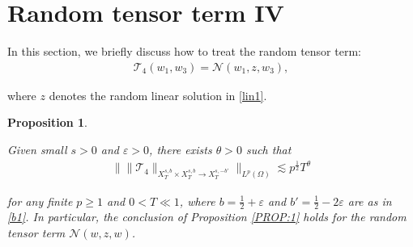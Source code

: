 \documentclass[%
11pt,  reqno]{amsart}
\newtheorem{proposition}[theorem]{Proposition}
\newcommand{\1}{\hspace{0.2mm}\text{I}\hspace{0.2mm}}
\newcommand{\noi}{\noindent}
\newcommand{\eps}{\varepsilon}
\newcommand{\ta}{\theta}
\renewcommand{\O}{\Omega}
\newcommand{\les}{\lesssim}
\newcommand{\NN}{\mathcal{N}}
\numberwithin{equation}{section}
\numberwithin{theorem}{section}
\newcommand{\TT}{\mathcal{T}}
\begin{document}
\section{Random tensor term IV}
\label{SEC:RT4}



In this section, we briefly discuss how to treat 
the  random tensor term:
\begin{align*}
\TT_4(w_1, w_3) =  \NN (w_1, z,w_3), 
\end{align*}

\noi
where $z$ denotes the random linear solution in \eqref{lin1}.





\begin{proposition}
\label{PROP:RT4}


Given small   $s > 0$ and $\eps > 0$, 
 there exists $\ta > 0$
such that 
\begin{align*}
\Big\| \| \TT_4 \|_{X^{s,b}_T\times X^{s,b}_T  \to 
X^{s,-b'}_T}  \Big\|_{L^p (\O)} 
\les p^\frac 12   T^\ta
\end{align*}

\noi
for any finite $p \ge 1$ and $0 < T\ll 1$, where 
$b = \frac 12 + \eps$ and $b' = \frac 12 - 2\eps$
are as in \eqref{b1}.
In particular, 
 the conclusion of Proposition \ref{PROP:1}
holds
for the random tensor term $\NN(w, z,  w)$.




\end{proposition}
\end{document}
